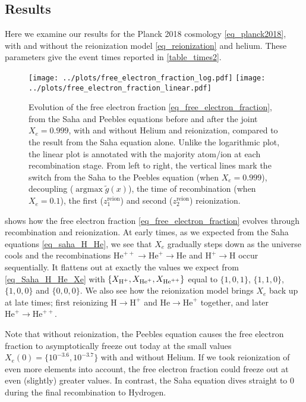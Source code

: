 \documentclass[10pt,a4paper]{article}
\DeclareMathOperator{\argmax}{argmax}
\begin{document}
\subsection{Results}

Here we examine our results for the Planck 2018 cosmology \eqref{eq_planck2018},
with and without the reionization model \eqref{eq_reionization} and helium.
These parameters give the event times reported in \cref{table_times2}.

\begin{figure}
	\centering
	\texttt{[image: ../plots/free\_electron\_fraction\_log.pdf]}
	\texttt{[image: ../plots/free\_electron\_fraction\_linear.pdf]}
	\caption{%
		Evolution of the free electron fraction \eqref{eq_free_electron_fraction},
		from the Saha and Peebles equations before and after the joint $X_e = 0.999$,
		with and without Helium and reionization, compared to the result from the Saha equation alone.
		Unlike the logarithmic plot, the linear plot is annotated with the majority atom/ion at each recombination stage.
		From left to right, the vertical lines mark
		the switch from the Saha to the Peebles equation (when $X_e = 0.999$),
		decoupling ($\argmax{\tilde{g}(x)}$),
		the time of recombination (when $X_e = 0.1$),
		the first ($z^\text{reion}_1$) and second ($z^\text{reion}_2$) reionization.
	}
	\label{fig_free_electron_fraction}
\end{figure}

 shows how the free electron fraction \eqref{eq_free_electron_fraction} evolves through recombination and reionization.
At early times, as we expected from the Saha equations \eqref{eq_saha_H_He},
we see that $X_e$ gradually steps down as the universe cools and the recombinations $\text{He}^{++} \rightarrow \text{He}^+ \rightarrow \text{He}$ and $\text{H}^+ \rightarrow \text{H}$ occur sequentially.
It flattens out at exactly the values we expect from \eqref{eq_Saha_H_He_Xe} with $\{X_{\text{H}^+}, X_{\text{He}^+}, X_{\text{He}^{++}}\}$ equal to $\{1,0,1\}$, $\{1,1,0\}$, $\{1,0,0\}$ and $\{0,0,0\}$.
We also see how the reionization model brings $X_e$ back up at late times;
first reionizing $\text{H} \rightarrow \text{H}^+$ and $\text{He} \rightarrow \text{He}^+$ together,
and later $\text{He}^{+} \rightarrow \text{He}^{++}$.

Note that without reionization, the Peebles equation causes the free electron fraction to asymptotically freeze out today at the small values $X_e(0) = \{10^{-3.6}, 10^{-3.7}\}$ with and without Helium.
If we took reionization of even more elements into account, the free electron fraction could freeze out at even (slightly) greater values.
In contrast, the Saha equation dives straight to $0$ during the final recombination to Hydrogen.
\end{document}

